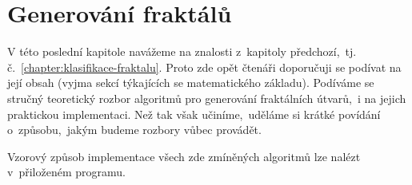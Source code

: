 \chapter{Generování fraktálů}\label{chapter:generovani-fraktalu}

V této poslední kapitole navážeme na znalosti z~kapitoly předchozí,~tj. č.~\ref{chapter:klasifikace-fraktalu}. Proto zde opět čtenáři doporučuji se podívat na její obsah (vyjma sekcí týkajících se matematického základu). Podíváme se stručný teoretický rozbor algoritmů pro generování fraktálních útvarů,~i na jejich praktickou implementaci. Než tak však učiníme,~uděláme si krátké povídání o~způsobu,~jakým budeme rozbory vůbec provádět.

Vzorový způsob implementace všech zde zmíněných algoritmů lze nalézt v~přiloženém programu.





